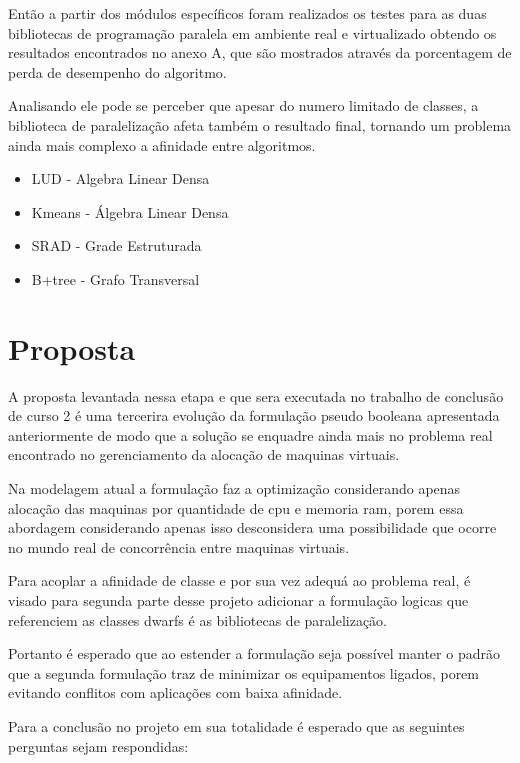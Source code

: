 Então a partir dos módulos específicos foram realizados os testes para as duas bibliotecas de programação paralela em ambiente real e virtualizado obtendo os resultados encontrados no anexo A, que são mostrados através da porcentagem de perda de desempenho do algoritmo.

Analisando ele pode se perceber que apesar do numero limitado de classes, a biblioteca de paralelização afeta também o resultado final, tornando um problema ainda mais complexo a afinidade entre algoritmos.


\begin{itemize}

\item LUD - Algebra Linear Densa

\item Kmeans - Álgebra Linear Densa

\item SRAD - Grade Estruturada

\item B+tree - Grafo Transversal

\end{itemize}

\chapter[Proposta]{Proposta}

A proposta levantada nessa etapa e que sera executada no trabalho de conclusão de curso 2 é uma tercerira evolução da formulação pseudo booleana apresentada anteriormente de modo que a solução se enquadre ainda mais no problema real encontrado no gerenciamento da alocação de maquinas virtuais.

Na modelagem atual a formulação faz a optimização considerando apenas alocação das maquinas por quantidade de cpu e memoria ram, porem essa abordagem considerando apenas isso desconsidera uma possibilidade que ocorre no mundo real de concorrência entre maquinas virtuais.

Para acoplar a afinidade de classe e por sua vez adequá ao problema real, é visado para segunda parte desse projeto adicionar a formulação logicas que referenciem as classes dwarfs é as bibliotecas de paralelização.

Portanto é esperado que ao estender a formulação seja possível manter o padrão que a segunda formulação traz de minimizar os equipamentos ligados, porem evitando conflitos com aplicações com baixa afinidade.

Para a conclusão no projeto em sua totalidade é esperado que as seguintes perguntas sejam respondidas:

